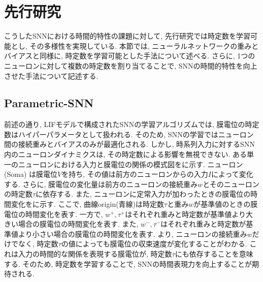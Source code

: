 \section{先行研究}
こうしたSNNにおける時間的特性の課題に対して, 先行研究では時定数を学習可能とし, その多様性を実現している\cite{dhsnn, yin2020effective, paramsnn}.
本節では, ニューラルネットワークの重みとバイアスと同様に, 時定数を学習可能とした手法について述べる.
さらに, 1つのニューロンに対して複数の時定数を割り当てることで, SNNの時間的特性を向上させた手法について記述する.

\subsection{Parametric-SNN}
前述の通り, LIFモデルで構成されたSNNの学習アルゴリズムでは, 膜電位の時定数はハイパーパラメータとして扱われる.
そのため, SNNの学習ではニューロン間の接続重みとバイアスのみが最適化される.
しかし, 時系列入力に対するSNN内のニューロンダイナミクスは, その時定数による影響を無視できない.
ある単一のニューロンにおける入力と膜電位の関係の模式図をに示す.
ニューロン (Soma) は膜電位$V$を持ち, その値は前方のニューロンからの入力$I$によって変化する.
さらに, 膜電位の変化量は前方のニューロンの接続重み$w$とそのニューロンの時定数$\tau$に依存する.
また, ニューロンに定常入力が加わったときの膜電位の時間変化をに示す.
ここで, 曲線origin(青線)は時定数$\tau$と重み$w$が基準値のときの膜電位の時間変化を表す.
一方で, $w^+, \tau^+$はそれぞれ重みと時定数が基準値より大きい場合の膜電位の時間変化を表す.
また, $w^-, \tau^-$はそれぞれ重みと時定数が基準値より小さい場合の膜電位の時間変化を表す.
より, ニューロンの接続重み$w$だけでなく, 時定数$\tau$の値によっても膜電位の収束速度が変化することがわかる.
これは入力の時間的な関係を表現する膜電位が, 時定数$\tau$にも依存することを意味する.
そのため, 時定数を学習することで, SNNの時間表現力を向上することが期待される.
